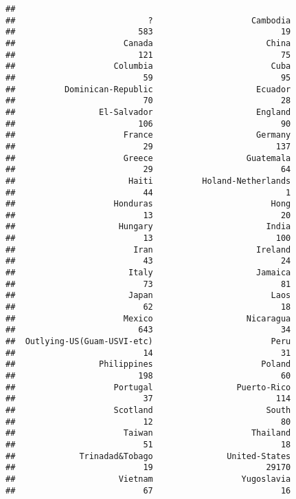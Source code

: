 \documentclass[]{article}
\newenvironment{Shaded}{\begin{snugshade}}{\end{snugshade}}
\newcommand{\DataTypeTok}[1]{\textcolor[rgb]{0.13,0.29,0.53}{#1}}
\newcommand{\KeywordTok}[1]{\textcolor[rgb]{0.13,0.29,0.53}{\textbf{#1}}}
\newcommand{\NormalTok}[1]{#1}
\newcommand{\OperatorTok}[1]{\textcolor[rgb]{0.81,0.36,0.00}{\textbf{#1}}}
\newcommand{\StringTok}[1]{\textcolor[rgb]{0.31,0.60,0.02}{#1}}
\begin{document}
\begin{Shaded}
\end{Shaded}

\begin{verbatim}
## 
##                           ?                    Cambodia 
##                         583                          19 
##                      Canada                       China 
##                         121                          75 
##                    Columbia                        Cuba 
##                          59                          95 
##          Dominican-Republic                     Ecuador 
##                          70                          28 
##                 El-Salvador                     England 
##                         106                          90 
##                      France                     Germany 
##                          29                         137 
##                      Greece                   Guatemala 
##                          29                          64 
##                       Haiti          Holand-Netherlands 
##                          44                           1 
##                    Honduras                        Hong 
##                          13                          20 
##                     Hungary                       India 
##                          13                         100 
##                        Iran                     Ireland 
##                          43                          24 
##                       Italy                     Jamaica 
##                          73                          81 
##                       Japan                        Laos 
##                          62                          18 
##                      Mexico                   Nicaragua 
##                         643                          34 
##  Outlying-US(Guam-USVI-etc)                        Peru 
##                          14                          31 
##                 Philippines                      Poland 
##                         198                          60 
##                    Portugal                 Puerto-Rico 
##                          37                         114 
##                    Scotland                       South 
##                          12                          80 
##                      Taiwan                    Thailand 
##                          51                          18 
##             Trinadad&Tobago               United-States 
##                          19                       29170 
##                     Vietnam                  Yugoslavia 
##                          67                          16
\end{verbatim}
\end{document}
